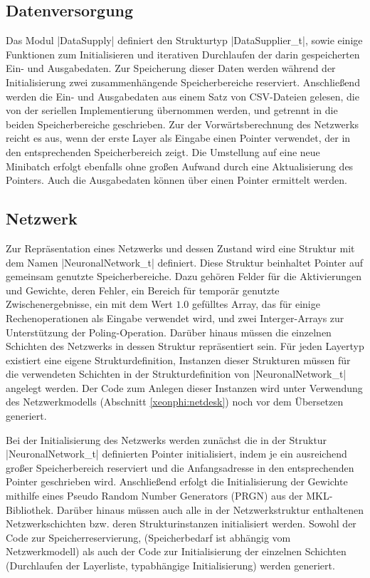 \documentclass[../main.tex]{subfiles}
\begin{document}
\subsection{Datenversorgung}
Das Modul |DataSupply| definiert den Strukturtyp |DataSupplier_t|, sowie einige Funktionen zum Initialisieren und iterativen Durchlaufen der darin gespeicherten Ein- und Ausgabedaten. Zur Speicherung dieser Daten werden während der Initialisierung zwei zusammenhängende Speicherbereiche reserviert. Anschließend werden die Ein- und Ausgabedaten aus einem Satz von CSV-Dateien gelesen, die von der seriellen Implementierung übernommen werden, und getrennt in die beiden Speicherbereiche geschrieben. Zur der Vorwärtsberechnung des Netzwerks reicht es aus, wenn der erste Layer als Eingabe einen Pointer verwendet, der in den entsprechenden Speicherbereich zeigt. Die Umstellung auf eine neue Minibatch erfolgt ebenfalls ohne großen Aufwand durch eine Aktualisierung des Pointers. Auch die Ausgabedaten können über einen Pointer ermittelt werden. 

\subsection{Netzwerk}
Zur Repräsentation eines Netzwerks und dessen Zustand wird eine Struktur mit dem Namen |NeuronalNetwork_t| definiert. Diese Struktur beinhaltet Pointer auf gemeinsam genutzte Speicherbereiche. Dazu gehören Felder für die Aktivierungen und Gewichte, deren Fehler, ein Bereich für temporär genutzte Zwischenergebnisse, ein mit dem Wert \(1.0\) gefülltes Array, das für einige Rechenoperationen als Eingabe verwendet wird, und zwei Interger-Arrays zur Unterstützung der Poling-Operation. Darüber hinaus müssen die einzelnen Schichten des Netzwerks in dessen Struktur repräsentiert sein. Für jeden Layertyp existiert eine eigene Strukturdefinition, Instanzen dieser Strukturen müssen für die verwendeten Schichten in der Strukturdefinition von |NeuronalNetwork_t| angelegt werden. Der Code zum Anlegen dieser Instanzen wird unter Verwendung des Netzwerkmodells (Abschnitt \ref{xeonphi:netdesk}) noch vor dem Übersetzen generiert. 

Bei der Initialisierung des Netzwerks werden zunächst die in der Struktur |NeuronalNetwork_t| definierten Pointer initialisiert, indem je ein ausreichend großer Speicherbereich reserviert und die Anfangsadresse in den entsprechenden Pointer geschrieben wird. Anschließend erfolgt die Initialisierung der Gewichte mithilfe eines Pseudo Random Number Generators (PRGN) aus der MKL-Bibliothek. Darüber hinaus müssen auch alle in der Netzwerkstruktur enthaltenen Netzwerkschichten bzw. deren Strukturinstanzen initialisiert werden. Sowohl der Code zur Speicherreservierung, (Speicherbedarf ist abhängig vom Netzwerkmodell) als auch der Code zur Initialisierung der einzelnen Schichten (Durchlaufen der Layerliste, typabhängige Initialisierung) werden generiert. 
\end{document}
